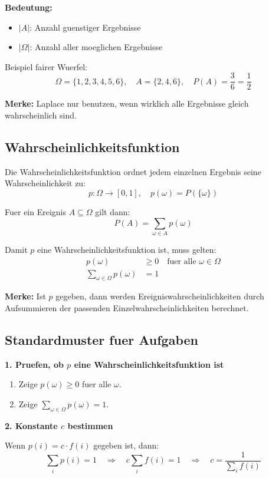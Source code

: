 \documentclass[a4paper,11pt]{article}
\begin{document}
\textbf{Bedeutung:}
\begin{itemize}
  \item $|A|$: Anzahl guenstiger Ergebnisse
  \item $|\Omega|$: Anzahl aller moeglichen Ergebnisse
\end{itemize}

Beispiel fairer Wuerfel:
\[
\Omega = \{1,2,3,4,5,6\}, \quad A = \{2,4,6\}, \quad P(A) = \frac{3}{6} = \frac{1}{2}
\]

\textbf{Merke:}
Laplace nur benutzen, wenn wirklich alle Ergebnisse gleich wahrscheinlich sind.

\subsection{Wahrscheinlichkeitsfunktion}
Die Wahrscheinlichkeitsfunktion ordnet jedem einzelnen Ergebnis seine Wahrscheinlichkeit zu:
\[
p : \Omega \to [0,1], \quad p(\omega) = P(\{\omega\})
\]

Fuer ein Ereignis $A \subseteq \Omega$ gilt dann:
\[
P(A) = \sum_{\omega \in A} p(\omega)
\]

Damit $p$ eine Wahrscheinlichkeitsfunktion ist, muss gelten:
\begin{align*}
p(\omega) &\geq 0 \quad \text{fuer alle } \omega \in \Omega \\
\sum_{\omega \in \Omega} p(\omega) &= 1
\end{align*}

\textbf{Merke:}
Ist $p$ gegeben, dann werden Ereigniswahrscheinlichkeiten durch Aufsummieren der passenden Einzelwahrscheinlichkeiten berechnet.

\subsection{Standardmuster fuer Aufgaben}
\textbf{1. Pruefen, ob $p$ eine Wahrscheinlichkeitsfunktion ist}
\begin{enumerate}
  \item Zeige $p(\omega) \geq 0$ fuer alle $\omega$.
  \item Zeige $\sum_{\omega \in \Omega} p(\omega) = 1$.
\end{enumerate}

\textbf{2. Konstante $c$ bestimmen}

Wenn $p(i) = c \cdot f(i)$ gegeben ist, dann:
\[
\sum_i p(i) = 1
\quad \Rightarrow \quad
c \sum_i f(i) = 1
\quad \Rightarrow \quad
c = \frac{1}{\sum_i f(i)}
\]
\end{document}
